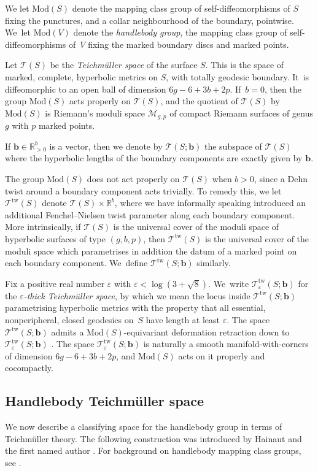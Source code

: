 \documentclass[JEP,XML,SOM,Unicode,NoFloatCountersInSection,published]{cedram}
\newcommand{\bb}{\boldsymbol{b}}
\theoremstyle{plain}
\theoremstyle{definition}
\let\eps\varepsilon
\newcommand{\R}{\mathbb R}
\newcommand{\T}{\mathcal T}
\newcommand{\TT}{\mathcal T^{\mathrm{tw}}}
\newcommand{\mcg}{\mathrm{Mod}}
\newcommand{\hmod}{\mathrm{Mod}}
\begin{document}
We let $\mcg(S)$ denote the mapping class group of self-diffeomorphisms of $S$ fixing the punctures, and a collar neighbourhood of the boundary, pointwise. We~let $\hmod(V)$ denote the \emph{handlebody group}, \ie the mapping class group of self-diffeomorphisms of~$V$ fixing the marked boundary discs and marked points.

Let $\T(S)$ be the \emph{Teichmüller space} of the surface $S$. This is the space of marked, complete, hyperbolic metrics on $S$, with totally geodesic boundary. It~is diffeomorphic to an open ball of dimension $6g-6+3b+2p$. If~$b=0$, then the group $\mcg(S)$ acts properly on $\T(S)$, and the quotient of $\T(S)$ by $\mcg(S)$ is Riemann's moduli space $\mathcal M_{g,p}$ of compact Riemann surfaces of genus $g$ with $p$ marked points.

If $\bb \in \mathbb R^b_{>0}$ is a vector, then we denote by $\T(S;\bb)$ the subspace of $\T(S)$ where the hyperbolic lengths of the boundary components are exactly given by $\bb$.

The group $\mcg(S)$ does not act properly on $\T(S)$ when $b>0$, since a Dehn twist around a boundary component acts trivially. To remedy this, we let $\TT(S)$ denote $\T(S) \times \R^b$, where we have informally speaking introduced an additional Fenchel--Nielsen twist parameter along each boundary component. More intrinsically, if $\T(S)$ is the universal cover of the moduli space of hyperbolic surfaces of type $(g,b,p)$, then $\TT(S)$ is the universal cover of the moduli space which parametrises in addition the datum of a marked point on each boundary component. We~define $\TT(S;\bb)$ similarly.

Fix a positive real number $\eps$ with $\eps<\log(3+\sqrt 8)$. We~write $\TT_\eps(S;\bb)$ for the \emph{$\eps$-thick Teichmüller space}, by which we mean the locus inside $\TT(S;\bb)$ parametrising hyperbolic metrics with the property that all essential, nonperipheral, closed geodesics on~$S$ have length at least $\eps$. The space $\TT(S;\bb)$ admits a $\mcg(S)$-equivariant deformation retraction down to $\TT_\eps(S;\bb)$ \cite{jiwolpert}. The space $\TT_\eps(S;\bb)$ is naturally a smooth manifold-with-corners of dimension $6g-6+3b+2p$, and $\mcg(S)$ acts on it properly and cocompactly.

\subsection{Handlebody Teichmüller space}
We now describe a classifying space for the handlebody group in terms of Teichmüller theory. The following construction was introduced by Hainaut and the first named author \cite{hainautpetersen}. For background on handlebody mapping class groups, see \cite{hensel}.
\end{document}
